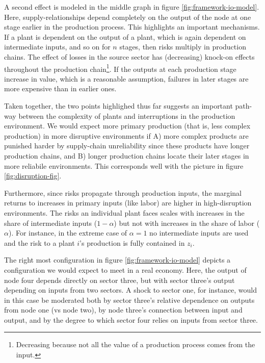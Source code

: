 \documentclass[11pt]{article}
\begin{document}
A second effect is modeled in the middle graph in figure \ref{fig:framework-io-model}. Here, supply-relationships depend completely on the output of the node at one stage earlier in the production process. This highlights an important mechanisms. If a plant is dependent on the output of a plant, which is again dependent on intermediate inputs, and so on for \(n\) stages, then risks multiply in production chains. The effect of losses in the source sector has (decreasing) knock-on effects throughout the production chain\footnote{Decreasing because not all the value of a production process comes from the input.}. If the outputs at each production stage increase in value, which is a reasonable assumption, failures in later stages are more expensive than in earlier ones.

Taken together, the two points highlighed thus far suggests an important path-way between the complexity of plants and interruptions in the production environment.  We would expect more primary production (that is, less complex production) in more disruptive environments if A) more complex products are punished harder by supply-chain unreliability since these products have longer production chains, and B) longer production chains locate their later stages in more reliabile environments. This corresponds well with the picture in figure \ref{fig:disruption-fig}. 

Furthermore, since risks propagate through production inputs, the marginal returns to increases in primary inputs (like labor) are higher in high-disruption environments. The risks an individual plant faces scales with increases in the share of intermediate inputs (\(1 - \alpha\)) but not with increases in the share of labor (\(\alpha\)). For instance, in the extreme case of \(\alpha = 1\) no intermediate inputs are used and the risk to a plant \(i\)'s production is fully contained in \(z_i\). 

The right most configuration in figure \ref{fig:framework-io-model} depicts a configuration we would expect to meet in a real economy. Here, the output of node four depends directly on sector three, but with sector three's output depending on inputs from two sectors. A shock to sector one, for instance, would in this case be moderated both by sector three's relative dependence on outputs from node one (vs node two), by node three's connection between input and output, and by the degree to which sector four relies on inputs from sector three.
\end{document}
